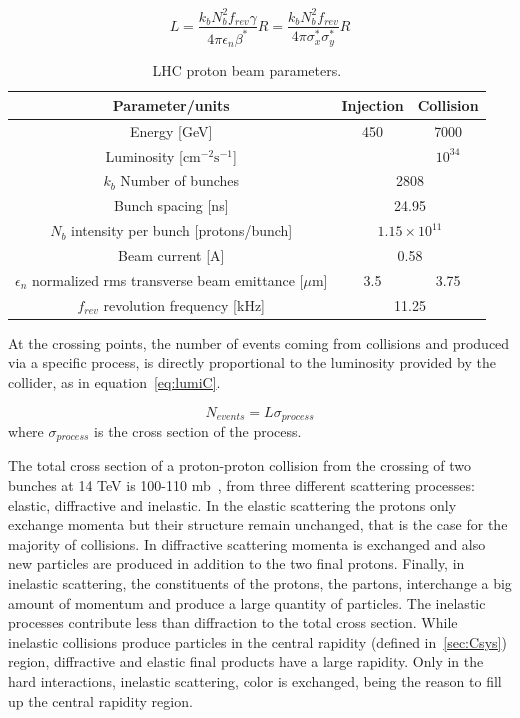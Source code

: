 \begin{equation}
  \label{eq:lumiC}
  L=\frac{k_{b}N_{b}^{2}f_{rev}\gamma}{4\pi\epsilon_{n}\beta^{*}}R=\frac{k_{b}N_{b}^{2}f_{rev}}{4\pi\sigma^{*}_{x}\sigma^{*}_{y}}R
\end{equation}

\begin{table}[htbH]
\label{tab:LHCparams}
\begin{center}
\caption{LHC proton beam parameters.\label{tab:LHCparams}}
\begin{tabular}{|c|c c|}
\hline 
Parameter/units & Injection & Collision \\
\hline
Energy [GeV]& 450 & 7000 \\ 
Luminosity [$\text{cm}^{-2}\text{s}^{-1}$] & & $10^{34}$ \\
$k_{b}$ Number of bunches & \multicolumn{2}{c|}{2808} \\
Bunch spacing [ns] & \multicolumn{2}{c|}{24.95} \\
$N_{b}$ intensity per bunch [protons/bunch] & \multicolumn{2}{c|}{$1.15\times 10^{11}$} \\
Beam current [A] & \multicolumn{2}{c|}{0.58} \\
$\epsilon_{n}$ normalized rms transverse beam emittance [$\mu$m] & 3.5 & 3.75 \\ 
$f_{rev}$ revolution frequency [kHz] & \multicolumn{2}{c|}{11.25} \\
\hline
\end{tabular}
\end{center}
\end{table}

At the crossing points, the number of events coming from collisions and produced via a specific process, is directly proportional to the luminosity provided by the collider, as in equation~\ref{eq:lumiC}.

\begin{equation}
  \label{eq:lumiN}
  N_{events}=L\sigma_{process}
\end{equation} where $\sigma_{process}$ is the cross section of the process. 

The total cross section of a proton-proton collision from the crossing of two bunches at 14 TeV is 100-110 mb~\cite{Augier:1993ta}, from three different scattering processes: elastic, diffractive and inelastic. In the elastic scattering the protons only exchange momenta but their structure remain unchanged, that is the case for the majority of collisions. In diffractive scattering momenta is exchanged and also new particles are produced in addition to the two final protons. Finally, in inelastic scattering, the constituents of the protons, the partons, interchange a big amount of momentum and produce a large quantity of particles. The inelastic processes contribute less than diffraction to the total cross section. While inelastic collisions produce particles in the central rapidity (defined in~\ref{sec:Csys}) region, diffractive and elastic final products have a large rapidity. Only in the hard interactions, inelastic scattering, color is exchanged, being the reason to fill up the central rapidity region. 

